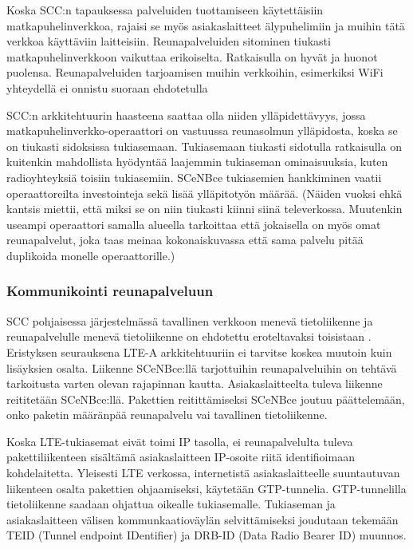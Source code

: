 \documentclass[finnish]{tktltiki2}
\theoremstyle{definition}
\theoremstyle{remark}
\begin{document}
Koska SCC:n tapauksessa palveluiden tuottamiseen käytettäisiin matkapuhelinverkkoa, rajaisi se myös asiakaslaitteet älypuhelimiin ja muihin tätä verkkoa käyttäviin laitteisiin.
Reunapalveluiden sitominen tiukasti matkapuhelinverkkoon vaikuttaa erikoiselta.
Ratkaisulla on hyvät ja huonot puolensa. Reunapalveluiden tarjoamisen muihin verkkoihin, esimerkiksi WiFi yhteydellä ei onnistu suoraan ehdotetulla 

SCC:n arkkitehtuurin haasteena saattaa olla niiden ylläpidettävyys, jossa matkapuhelinverkko-operaattori on vastuussa reunasolmun ylläpidosta, koska se on tiukasti sidoksissa tukiasemaan\cite{lobillo15scc}.
Tukiasemaan tiukasti sidotulla ratkaisulla on kuitenkin mahdollista hyödyntää laajemmin tukiaseman ominaisuuksia, kuten radioyhteyksiä toisiin tukiasemiin.
SCeNBce tukiasemien hankkiminen vaatii operaattoreilta investointeja sekä lisää ylläpitotyön määrää. (Näiden vuoksi ehkä kantsis miettii, että miksi se on niin tiukasti kiinni siinä televerkossa. Muutenkin useampi operaattori samalla alueella tarkoittaa että jokaisella on myös omat reunapalvelut, joka taas meinaa kokonaiskuvassa että sama palvelu pitää duplikoida monelle operaattorille.)

\subsubsection{Kommunikointi reunapalveluun}
SCC pohjaisessa järjestelmässä tavallinen verkkoon menevä tietoliikenne ja reunapalvelulle menevä tietoliikenne on ehdotettu eroteltavaksi toisistaan \cite{puente15seamless}.
Eristyksen seurauksena LTE-A arkkitehtuuriin ei tarvitse koskea muutoin kuin lisäyksien osalta. 
Liikenne SCeNBce:llä tarjottuihin reunapalveluihin on tehtävä tarkoitusta varten olevan rajapinnan kautta.
Asiakaslaitteelta tuleva liikenne reititetään SCeNBce:llä. 
Pakettien reitittämiseksi SCeNBce joutuu päättelemään, onko paketin määränpää reunapalvelu vai tavallinen tietoliikenne.

 Koska LTE-tukiasemat eivät toimi IP tasolla, ei reunapalvelulta tuleva pakettiliikenteen sisältämä asiakaslaitteen IP-osoite riitä identifioimaan kohdelaitetta. 
Yleisesti LTE verkossa, internetistä asiakaslaitteelle suuntautuvan liikenteen osalta pakettien ohjaamiseksi, käytetään GTP-tunnelia. GTP-tunnelilla tietoliikenne saadaan ohjattua oikealle tukiasemalle.
Tukiaseman ja asiakaslaitteen välisen kommunkaatioväylän selvittämiseksi joudutaan tekemään TEID (Tunnel endpoint IDentifier) ja DRB-ID (Data Radio Bearer ID) muunnos.
\end{document}
